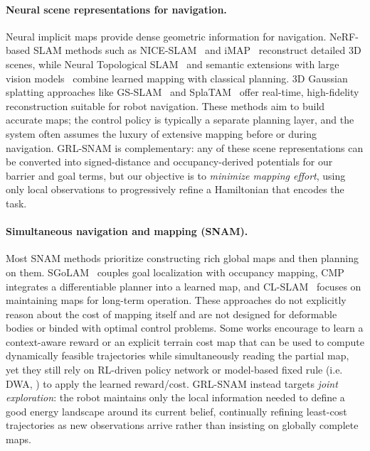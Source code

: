 \documentclass{article} %
\begin{document}
\paragraph{Neural scene representations for navigation.}
Neural implicit maps provide dense geometric information for navigation. NeRF-based SLAM methods such as NICE-SLAM~\citep{zhu2022nice} and iMAP~\citep{sucar2021imap} reconstruct detailed 3D scenes, while Neural Topological SLAM~\citep{chaplot2020neural} and semantic extensions with large vision models~\citep{zheng2025semantic} combine learned mapping with classical planning. 3D Gaussian splatting approaches like GS-SLAM~\citep{yan2024gs} and SplaTAM~\citep{keetha2024splatam} offer real-time, high-fidelity reconstruction suitable for robot navigation. These methods aim to build accurate maps; the control policy is typically a separate planning layer, and the system often assumes the luxury of extensive mapping before or during navigation. GRL-SNAM is complementary: any of these scene representations can be converted into signed-distance and occupancy-derived potentials for our barrier and goal terms, but our objective is to \emph{minimize mapping effort}, using only local observations to progressively refine a Hamiltonian that encodes the task.

\paragraph{Simultaneous navigation and mapping (SNAM).}
Most SNAM methods prioritize constructing rich global maps and then planning on them. SGoLAM~\citep{sgolam2021} couples goal localization with occupancy mapping, CMP~\citep{gupta2017cognitive} integrates a differentiable planner into a learned map, and CL-SLAM~\citep{clslam2022} focuses on maintaining maps for long-term operation. These approaches do not explicitly reason about the cost of mapping itself and are not designed for deformable bodies or binded with optimal control problems. Some works encourage to learn a context-aware reward \citep{liang2023context} or an explicit terrain cost map \citep{sathyamoorthy2022terrapn} that can be used to compute dynamically feasible trajectories while simultaneously reading the partial map, yet they still rely on RL-driven policy network or model-based fixed rule (i.e. DWA, \citet{fox2002dynamic}) to apply the learned reward/cost. GRL-SNAM instead targets \emph{joint exploration}: the robot maintains only the local information needed to define a good energy landscape around its current belief, continually refining least-cost trajectories as new observations arrive rather than insisting on globally complete maps.
\end{document}
